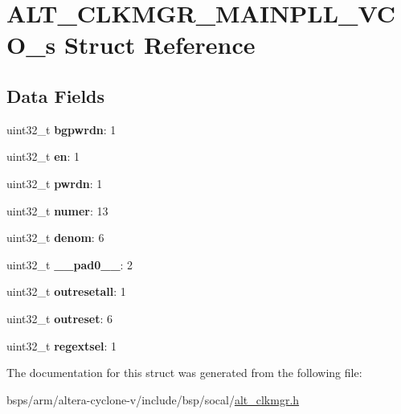 \hypertarget{structALT__CLKMGR__MAINPLL__VCO__s}{}\section{A\+L\+T\+\_\+\+C\+L\+K\+M\+G\+R\+\_\+\+M\+A\+I\+N\+P\+L\+L\+\_\+\+V\+C\+O\+\_\+s Struct Reference}
\label{structALT__CLKMGR__MAINPLL__VCO__s}
\subsection*{Data Fields}
\begin{DoxyCompactItemize}
\item 
\mbox{\label{structALT__CLKMGR__MAINPLL__VCO__s_ab89dd0af322c175674de4d2104750ef6}} 
uint32\+\_\+t {\bfseries bgpwrdn}\+: 1
\item 
\mbox{\label{structALT__CLKMGR__MAINPLL__VCO__s_a2814832566d9f26f6600cde4baed302e}} 
uint32\+\_\+t {\bfseries en}\+: 1
\item 
\mbox{\label{structALT__CLKMGR__MAINPLL__VCO__s_a09cceff6d0fd5ea73a2c9f9b58146aa9}} 
uint32\+\_\+t {\bfseries pwrdn}\+: 1
\item 
\mbox{\label{structALT__CLKMGR__MAINPLL__VCO__s_a04f8425f1537a5bab7d901de51fd3b22}} 
uint32\+\_\+t {\bfseries numer}\+: 13
\item 
\mbox{\label{structALT__CLKMGR__MAINPLL__VCO__s_a1c9cea7f2716ea9de3b5c3f814a7b5e6}} 
uint32\+\_\+t {\bfseries denom}\+: 6
\item 
\mbox{\label{structALT__CLKMGR__MAINPLL__VCO__s_af46d3f5c0b0fcc80f941d503fcb39343}} 
uint32\+\_\+t {\bfseries \+\_\+\+\_\+pad0\+\_\+\+\_\+}\+: 2
\item 
\mbox{\label{structALT__CLKMGR__MAINPLL__VCO__s_a52961fe09428b8153f8759806c7adb08}} 
uint32\+\_\+t {\bfseries outresetall}\+: 1
\item 
\mbox{\label{structALT__CLKMGR__MAINPLL__VCO__s_a1b67f27263a2a84ca16500fc87474960}} 
uint32\+\_\+t {\bfseries outreset}\+: 6
\item 
\mbox{\label{structALT__CLKMGR__MAINPLL__VCO__s_a7b6e96cc3d054b80c2355f7364f69b73}} 
uint32\+\_\+t {\bfseries regextsel}\+: 1
\end{DoxyCompactItemize}


The documentation for this struct was generated from the following file\+:\begin{DoxyCompactItemize}
\item 
bsps/arm/altera-\/cyclone-\/v/include/bsp/socal/\mbox{\hyperlink{alt__clkmgr_8h}{alt\+\_\+clkmgr.\+h}}\end{DoxyCompactItemize}
